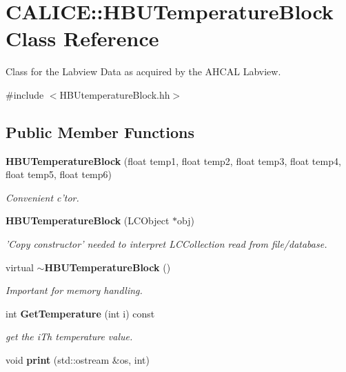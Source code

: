 \section{CALICE::HBUTemperatureBlock Class Reference}
\label{classCALICE_1_1HBUTemperatureBlock}


Class for the Labview Data as acquired by the AHCAL Labview.  


{\ttfamily \#include $<$HBUtemperatureBlock.hh$>$}\subsection*{Public Member Functions}
\begin{DoxyCompactItemize}
\item 
{\bf HBUTemperatureBlock} (float temp1, float temp2, float temp3, float temp4, float temp5, float temp6)\label{classCALICE_1_1HBUTemperatureBlock_a31c53d802bbe9d3d4ab67b89bcea84d9}

\begin{DoxyCompactList}\small\item\em Convenient c'tor. \item\end{DoxyCompactList}\item 
{\bf HBUTemperatureBlock} (LCObject $\ast$obj)\label{classCALICE_1_1HBUTemperatureBlock_a66aa0df1cd4816dc5a05993af1fcb20f}

\begin{DoxyCompactList}\small\item\em 'Copy constructor' needed to interpret LCCollection read from file/database. \item\end{DoxyCompactList}\item 
virtual {\bf $\sim$HBUTemperatureBlock} ()\label{classCALICE_1_1HBUTemperatureBlock_a990d55a7677c5410beb42efb680d5a6d}

\begin{DoxyCompactList}\small\item\em Important for memory handling. \item\end{DoxyCompactList}\item 
int {\bf GetTemperature} (int i) const \label{classCALICE_1_1HBUTemperatureBlock_a651fe2deafbd2658dafa95457a2883c9}

\begin{DoxyCompactList}\small\item\em get the iTh temperature value. \item\end{DoxyCompactList}\item 
void {\bf print} (std::ostream \&os, int)\label{classCALICE_1_1HBUTemperatureBlock_a9c8cbfa1f0cce53c37f4713301ac9106}


\end{DoxyCompactItemize}
